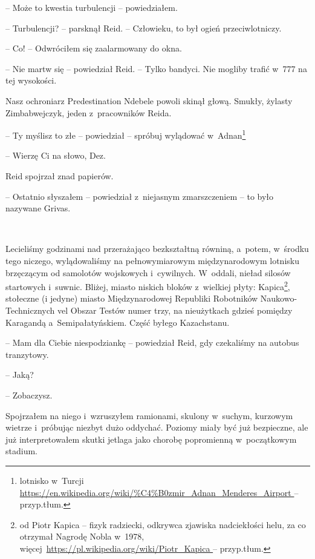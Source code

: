 \documentclass[oneside,polish,11pt,sfheadings]{mwbk}
\begin{document}
-- Może to kwestia turbulencji -- powiedziałem.

-- Turbulencji? -- parsknął Reid. -- Człowieku, to był ogień
przeciwlotniczy.

-- Co! -- Odwróciłem się zaalarmowany do okna.

-- Nie martw się -- powiedział Reid. -- Tylko bandyci. Nie mogliby trafić w~777 na tej wysokości.

Nasz ochroniarz Predestination Ndebele powoli skinął głową. Smukły,
żylasty Zimbabwejczyk, jeden z~pracowników Reida.

-- Ty myślisz to złe -- powiedział -- spróbuj wylądować w~Adnan\footnote{lotnisko w~Turcji \url{https://en.wikipedia.org/wiki/\%C4\%B0zmir_Adnan_Menderes_Airport } -- przyp.tłum.}

-- Wierzę Ci na słowo, Dez.

Reid spojrzał znad papierów. 

-- Ostatnio słyszałem -- powiedział z~niejasnym zmarszczeniem -- to było nazywane Grivas.

~

Lecieliśmy godzinami nad przerażająco bezkształtną równiną, a~potem, w~środku tego niczego, wylądowaliśmy na pełnowymiarowym międzynarodowym
lotnisku brzęczącym od samolotów wojskowych i~cywilnych. W~oddali,
nieład silosów startowych i~suwnic. Bliżej, miasto niskich bloków z~wielkiej płyty: Kapica\footnote{od Piotr Kapica -- fizyk radziecki, odkrywca
zjawiska nadciekłości helu, za co otrzymał Nagrodę Nobla w~1978,
więcej~\url{https://pl.wikipedia.org/wiki/Piotr_Kapica } -- przyp.tłum.}, stołeczne (i jedyne) miasto Międzynarodowej Republiki
Robotników Naukowo-Technicznych vel Obszar Testów numer trzy, na
nieużytkach gdzieś pomiędzy Karagandą a~Semipałatyńskiem. Część byłego
Kazachstanu.

-- Mam dla Ciebie niespodziankę -- powiedział Reid, gdy czekaliśmy na
autobus tranzytowy.

-- Jaką?

-- Zobaczysz.

Spojrzałem na niego i~wzruszyłem ramionami, skulony w~suchym, kurzowym
wietrze i~próbując niezbyt dużo oddychać. Poziomy miały być już
bezpieczne, ale już interpretowałem skutki jetlaga jako chorobę
popromienną w~początkowym stadium.
\end{document}
